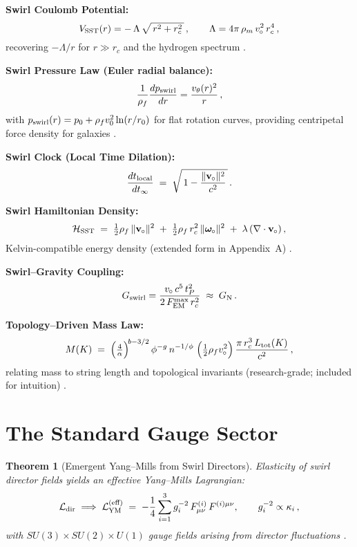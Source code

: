 \documentclass[11pt]{article}
\newtheorem{theorem}{Theorem}[section]
\begin{document}
	\textbf{Swirl Coulomb Potential:}
	\[
		V_{\rm SST}(r) = -\,\Lambda\,\sqrt{\,r^2 + r_c^2\,}\,, \qquad \Lambda = 4\pi\,\rho_m\,v_{\!\!\;\circ}^2\,r_c^4\,,
	\]
	recovering $-\Lambda/r$ for $r\gg r_c$ and the hydrogen spectrum \cite{Iskandarani2025Canon034,Iskandarani2025Hydrogen}.

	\textbf{Swirl Pressure Law (Euler radial balance):}
	\[
		\frac{1}{\rho_f}\frac{dp_{\rm swirl}}{dr} = \frac{v_\theta(r)^2}{\,r\,}\,,
	\]
	with $p_{\rm swirl}(r)=p_0+\rho_f v_0^2\ln(r/r_0)$ for flat rotation curves, providing centripetal force density for galaxies \cite{Batchelor1967,Saffman1992,Iskandarani2025Canon034}.

	\textbf{Swirl Clock (Local Time Dilation):}
	\[
		\frac{dt_{\rm local}}{dt_{\infty}} \;=\; \sqrt{\,1 - \frac{\|\mathbf{v}_{\!\!\;\circ}\|^2}{c^2}\,}\,.
	\]

	\textbf{Swirl Hamiltonian Density:}
	\[
		\mathcal{H}_{\rm SST} \;=\; \tfrac{1}{2}\rho_f\,\|\mathbf{v}_{\!\!\;\circ}\|^2 \;+\; \tfrac{1}{2}\rho_f\,r_c^2\,\|\boldsymbol{\omega}_{\!\!\;\circ}\|^2 \;+\; \lambda\,(\nabla\cdot\mathbf{v}_{\!\!\;\circ})\,,
	\]
	Kelvin-compatible energy density (extended form in Appendix~A) \cite{Batchelor1967,Saffman1992}.

	\textbf{Swirl--Gravity Coupling:}
	\[
		G_{\rm swirl} = \frac{v_{\!\!\;\circ}\,c^5\,t_P^2}{2\,F_{\rm EM}^{\max}\,r_c^2} \;\approx\; G_{\rm N}\,.
	\]

	\textbf{Topology--Driven Mass Law:}
	\[
		M(K)\;=\;\Big(\tfrac{4}{\alpha}\Big)^{\!b-3/2}\,\phi^{-g}\,n^{-1/\phi}\;\Big(\tfrac{1}{2}\rho_f v_{\!\!\;\circ}^2\Big)\,\frac{\pi\,r_c^3\,L_{\rm tot}(K)}{c^2}\,,
	\]
	relating mass to string length and topological invariants (research-grade; included for intuition) \cite{Iskandarani2025Canon034}.

	\section{The Standard Gauge Sector}

	\begin{theorem}[Emergent Yang--Mills from Swirl Directors]
		Elasticity of swirl director fields yields an effective Yang--Mills Lagrangian:
		\[
			\mathcal{L}_{\rm dir}\;\Longrightarrow\; \mathcal{L}_{\rm YM}^{\rm (eff)} \;=\; -\frac{1}{4}\sum_{i=1}^{3} g_i^{-2}\, F_{\mu\nu}^{(i)}\,F^{(i)\mu\nu}, \qquad g_i^{-2}\propto \kappa_i\,,
		\]
		with $SU(3)\times SU(2)\times U(1)$ gauge fields arising from director fluctuations \cite{ChoFaddeevNiemi1999,Iskandarani2025Canon034}.
	\end{theorem}
\end{document}
